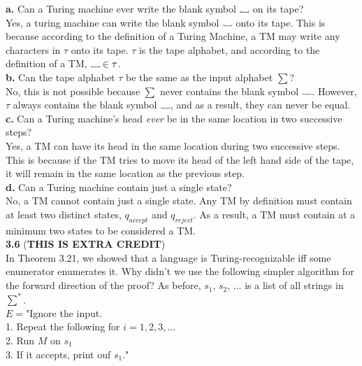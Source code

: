 \documentclass[12pt]{article}
\newcommand\Vtextvisiblespace[1][.8em]{%
	\mbox{\kern.07em\vrule height.3ex}%
	\vbox{\hrule width#1}%
	\hbox{\vrule height.3ex}}
\newcommand\tab[1][1cm]{\hspace*{#1}}
\begin{document}
\textbf{a.} Can a Turing machine ever write the blank symbol $\Vtextvisiblespace$ on its tape? \\

Yes, a turing machine can write the blank symbol $\Vtextvisiblespace$ onto its tape.
This is because according to the definition of a Turing Machine, a TM may write any
characters in $\tau$ onto its tape. $\tau$ is the tape alphabet, and according to the
definition of a TM, $\Vtextvisiblespace \in \tau $. \\

\textbf{b.} Can the tape alphabet $\tau$ be the same as the input alphabet $\sum$? \\

No, this is not possible because $\sum$ never contains the blank symbol $\Vtextvisiblespace$.
However, $\tau$ always contains the blank symbol $\Vtextvisiblespace$, and as a result,
they can never be equal. \\

\textbf{c.} Can a Turing machine’s head \textit{ever} be in the same location in two successive 
steps? \\

Yes, a TM can have its head in the same location during two successive steps. This is because
if the TM tries to move its head of the left hand side of the tape, it will remain in the same
location as the previous step. \\

\textbf{d.} Can a Turing machine contain just a single state? \\

No, a TM cannot contain just a single state. Any TM by definition must contain at least
two distinct states, $q_{accept}$ and $q_{reject}$. As a result, a TM must contain
at a minimum two states to be considered a TM. \\

\pagebreak
\textbf{3.6} (\textbf{THIS IS EXTRA CREDIT}) \\

In Theorem 3.21, we showed that a language is Turing-recognizable iff some 
enumerator enumerates it. Why didn’t we use the following simpler algorithm for the
forward direction of the proof? As before, $s_1$, $s_2$, ... is a list of all strings in $\sum^*$. \\

$E = $"Ignore the input. \\
\tab 1. Repeat the following for $i = 1, 2, 3, ...$ \\
\tab 2. Run $M$ on $s_1$ \\
\tab 3. If it accepts, print ouf $s_1$." \\
\end{document}
